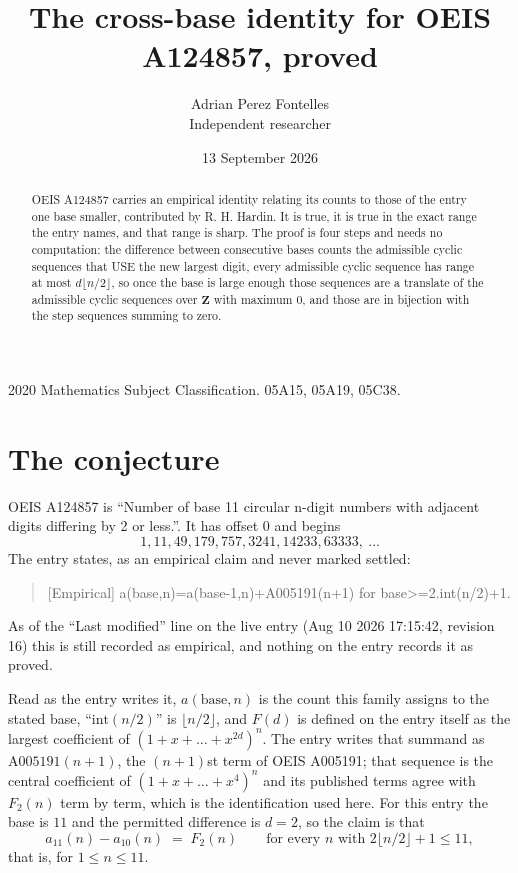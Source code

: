 \documentclass[11pt,a4paper]{article}
\title{The cross-base identity for OEIS A124857, proved}
\author{Adrian Perez Fontelles\\ \small Independent researcher}
\date{13 September 2026}
\theoremstyle{plain}
\theoremstyle{definition}
\begin{document}
\maketitle

\begin{abstract}
OEIS A124857 carries an empirical identity relating its counts to those of the entry one base
smaller, contributed by R. H. Hardin. It is true, it is true in the exact range the entry
names, and that range is sharp. The proof is four steps and needs no computation: the
difference between consecutive bases counts the admissible cyclic sequences that USE the new
largest digit, every admissible cyclic sequence has range at most $d\lfloor n/2\rfloor$, so
once the base is large enough those sequences are a translate of the admissible cyclic
sequences over $\mathbf{Z}$ with maximum $0$, and those are in bijection with the step
sequences summing to zero.
\end{abstract}

\noindent\small 2020 Mathematics Subject Classification. 05A15, 05A19, 05C38.\normalsize

\section{The conjecture}

OEIS A124857 is ``Number of base 11 circular n-digit numbers with adjacent digits differing by 2 or less.''. It has offset $0$ and begins
\[
1, 11, 49, 179, 757, 3241, 14233, 63333,\ \dots
\]
The entry states, as an empirical claim and never marked settled:
\begin{quote}
[Empirical] a(base,n)=a(base-1,n)+A005191(n+1) for base>=2.int(n/2)+1.
\end{quote}
As of the ``Last modified'' line on the live entry (Aug 10 2026 17:15:42, revision 16)
this is still recorded as empirical, and nothing on the entry records it as proved.

Read as the entry writes it, $a(\mathrm{base},n)$ is the count this family assigns to the
stated base, ``$\mathrm{int}(n/2)$'' is $\lfloor n/2\rfloor$, and $F(d)$ is defined on the
entry itself as the largest coefficient of $(1+x+\dots+x^{2d})^{n}$. The entry writes that summand as $\mathrm{A005191}(n+1)$, the $(n+1)$st term of OEIS A005191; that sequence is the central coefficient of $(1+x+\dots+x^{4})^{n}$ and its published terms agree with $F_{2}(n)$ term by term, which is the identification used here. For this entry
the base is $11$ and the permitted difference is $d=2$, so the claim is that
\[
a_{11}(n)-a_{10}(n)\;=\;F_{2}(n)
\qquad\text{for every } n \text{ with } 2\lfloor n/2\rfloor+1\le11,
\]
that is, for $1\le n\le11$.
\end{document}

